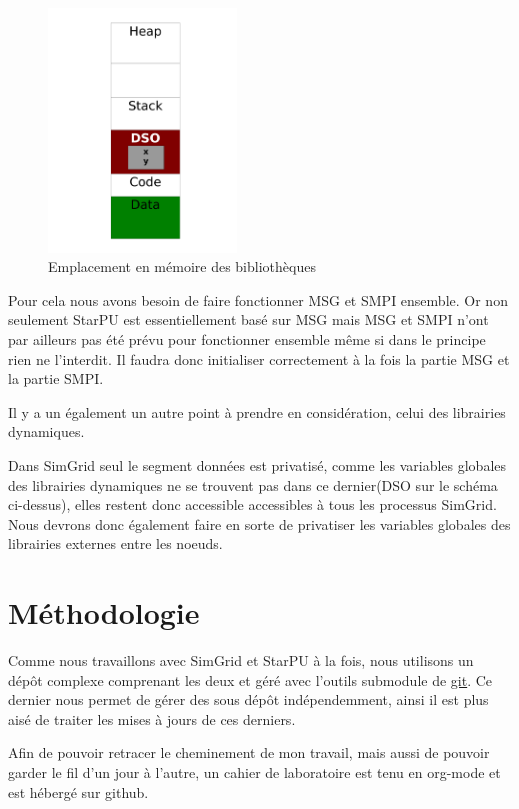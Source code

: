 \documentclass[smallextended]{svjour3}
\begin{document}
\begin{figure}
\vspace{-15mm}
\begin{center}
\includegraphics[width=5cm]{./Img/Dyn.pdf}
\end{center}
\caption{\label{fig:2}Emplacement en mémoire des bibliothèques}
\end{figure}

Pour cela nous avons besoin de faire fonctionner MSG et SMPI
ensemble. Or non seulement StarPU est essentiellement basé sur MSG
mais MSG et SMPI n'ont par ailleurs pas été prévu pour fonctionner
ensemble même si dans le principe rien ne l'interdit. Il
faudra donc initialiser correctement à la fois la partie MSG et la
partie SMPI.  

Il y a un également un autre point à prendre en considération,
celui des librairies dynamiques. 

Dans SimGrid seul le segment données est privatisé, comme les
variables globales des librairies dynamiques ne se trouvent pas
dans ce dernier(DSO sur le schéma ci-dessus), elles restent donc
accessible accessibles à tous les processus SimGrid. Nous devrons donc
également faire en sorte de privatiser les variables globales des
librairies externes entre les noeuds. 

\section{Méthodologie}
\label{sec-4}
Comme nous travaillons avec SimGrid et StarPU à la fois, nous
utilisons un dépôt complexe comprenant les deux et géré avec
l'outils submodule de \href{https://github.com/swhatelse/Journal}{git}. Ce dernier nous permet de gérer des sous
dépôt indépendemment, ainsi il est plus aisé de traiter les mises à
jours de ces derniers.

Afin de pouvoir retracer le cheminement de mon travail, mais aussi
de pouvoir garder le fil d'un jour à l'autre, un cahier de
laboratoire est tenu en org-mode et est hébergé sur github.
\end{document}
